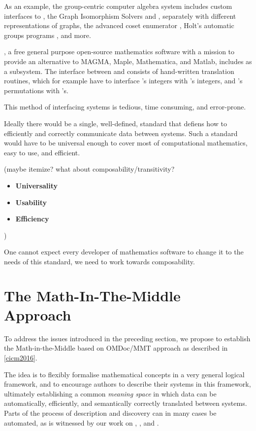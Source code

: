 As an example, the group-centric computer algebra system \GAP includes custom
interfaces to \Singular, the Graph Isomorphism Solvers \Nauty and \Bliss,
separately with different representations of graphs, the advanced coset
enumerator \ACE, Holt's automatic groups programs \KBMAG, and more.

\Sage, a free general purpose open-source mathematics software with a mission to
provide an alternative to MAGMA, Maple, Mathematica, and Matlab, includes \GAP
as a subsystem. The interface between \Sage and \GAP consists of hand-written
translation routines, which for example have to interface \Sage's integers with
\GAP's integers, and \Sage's permutations with \GAP's.

This method of interfacing systems is tedious, time consuming, and error-prone.

Ideally there would be a single, well-defined, standard that defiens how to
efficiently and correctly communicate data between systems.
Such a standard would have to be universal enough to cover most of
computational mathematics, easy to use, and efficient.

(maybe itemize? what about composability/transitivity?
\begin{itemize}
\item \textbf{Universality}
\item \textbf{Usability}
\item \textbf{Efficiency}
\end{itemize}
)

One cannot expect every developer of mathematics software to change it to
the needs of this standard, we need to work towards
composability.

\section{The Math-In-The-Middle Approach}

To address the issues introduced in the preceding section, we propose to
establish the Math-in-the-Middle based on OMDoc/MMT approach as described
in \ref{cicm2016}.

The idea is to flexibly formalise mathematical concepts in a very general
logical framework, and to encourage authors to describe their systems in this
framework, ultimately establishing a common \emph{meaning space} in which data
can be automatically, efficiently, and semantically correctly translated between
systems.
Parts of the process of description and discovery can in many cases be
automated, as is witnessed by our work on \GAP, \Sage, and \Lmfdb.

